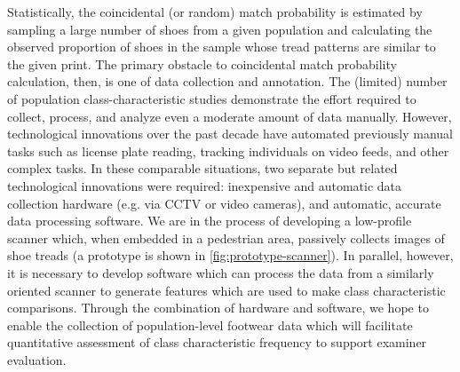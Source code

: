 \documentclass{article}\usepackage[]{graphicx}\usepackage[table]{xcolor}
\begin{document}
Statistically, the coincidental (or random) match probability is estimated by sampling a large number of shoes from a given population and calculating the observed proportion of shoes in the sample whose tread patterns are similar to the given print. The primary obstacle to coincidental match probability calculation, then, is one of data collection and annotation. The (limited) number of population class-characteristic studies \citep{parent_sandy_significance_nodate,benedict_geographical_2014} demonstrate the effort required to collect, process, and analyze even a moderate amount of data manually. However, technological innovations over the past decade have automated previously manual tasks such as license plate reading, tracking individuals on video feeds, and other complex tasks. In these comparable situations, two separate but related technological innovations were required: inexpensive and automatic data collection hardware (e.g. via CCTV or video cameras), and automatic, accurate data processing software. We are in the process of developing a low-profile scanner which, when embedded in a pedestrian area, passively collects images of shoe treads (a prototype is shown in \autoref{fig:prototype-scanner}). In parallel, however, it is necessary to develop software which can process the data from a similarly oriented scanner to generate features which are used to make class characteristic comparisons. Through the combination of hardware and software, we hope to enable the collection of population-level footwear data which will facilitate quantitative assessment of class characteristic frequency to support examiner evaluation.
\end{document}
